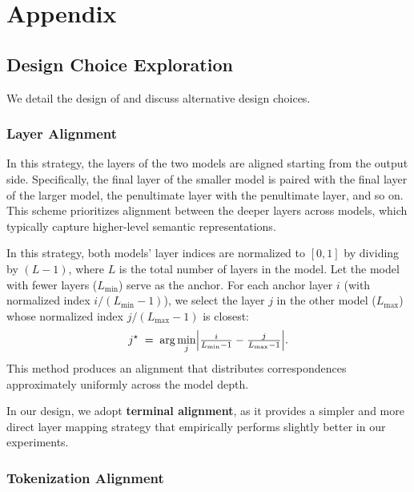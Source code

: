 \section{Appendix}
\label{sec:appendix}

\subsection{Design Choice Exploration}
\label{sec:appendix/design}

We detail the design of \name and discuss alternative design choices.

\subsubsection{Layer Alignment}
\label{sec:appendix/layer_align}

In this strategy, the layers of the two models are aligned starting from the output side. Specifically, the final layer of the smaller model is paired with the final layer of the larger model, the penultimate layer with the penultimate layer, and so on. This scheme prioritizes alignment between the deeper layers across models, which typically capture higher-level semantic representations.
  
In this strategy, both models’ layer indices are normalized to $[0,1]$ by dividing by $(L-1)$, where $L$ is the total number of layers in the model. Let the model with fewer layers ($L_{\min}$) serve as the anchor. For each anchor layer $i$ (with normalized index $i/(L_{\min}-1)$), we select the layer $j$ in the other model ($L_{\max}$) whose normalized index $j/(L_{\max}-1)$ is closest:
\begin{equation}
    j^\star \;=\; \arg\min_j \Bigl| \tfrac{i}{L_{\min}-1} - \tfrac{j}{L_{\max}-1} \Bigr|.
\end{equation}
This method produces an alignment that distributes correspondences approximately uniformly across the model depth.


In our design, we adopt \textbf{terminal alignment}, as it provides a simpler and more direct layer mapping strategy that empirically performs slightly better in our experiments.

\subsubsection{Tokenization Alignment}
\label{sec:appendix/token_align}

